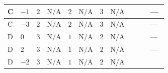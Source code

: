 \documentclass[8pt]{article}
\begin{document}
\begin{landscape}
\begin{longtable}{@{}llcccccc >{\raggedright\arraybackslash}p{0.21\linewidth} >{\raggedright\arraybackslash}p{0.21\linewidth} >{\raggedright\arraybackslash}p{0.21\linewidth}@{}}
\midrule
C & $-1$ & $2$ & $\text{N/A}$ & $2$ & $\text{N/A}$ & $3$ & $\text{N/A}$ & \scriptsize\adjustbox{max width=\linewidth}{$\begin{gathered} +4 {\lambda_{HS_1}^{(1)}}^2\end{gathered}$} & \scriptsize\adjustbox{max width=\linewidth}{$\begin{gathered} +6 {\lambda_{HS_1}^{(1)}} {\lambda_{S_1}^{(1)}}\end{gathered}$} & --- \\
\midrule
C & $-3$ & $2$ & $\text{N/A}$ & $2$ & $\text{N/A}$ & $3$ & $\text{N/A}$ & \scriptsize\adjustbox{max width=\linewidth}{$\begin{gathered} +4 {\lambda_{HS_1}^{(1)}}^2\end{gathered}$} & \scriptsize\adjustbox{max width=\linewidth}{$\begin{gathered} +6 {\lambda_{HS_1}^{(1)}} {\lambda_{S_1}^{(1)}}\end{gathered}$} & --- \\
\midrule
D & $0$ & $3$ & $\text{N/A}$ & $1$ & $\text{N/A}$ & $2$ & $\text{N/A}$ & \scriptsize\adjustbox{max width=\linewidth}{$\begin{gathered} +4 {\lambda_{HS_1}^{(1)}}^2\end{gathered}$} & \scriptsize\adjustbox{max width=\linewidth}{$\begin{gathered} +8 {\lambda_{HS_1}^{(1)}} {\lambda_{S_1}^{(1)}}\end{gathered}$} & --- \\
\midrule
D & $2$ & $3$ & $\text{N/A}$ & $1$ & $\text{N/A}$ & $2$ & $\text{N/A}$ & \scriptsize\adjustbox{max width=\linewidth}{$\begin{gathered} +4 {\lambda_{HS_1}^{(1)}}^2\end{gathered}$} & \scriptsize\adjustbox{max width=\linewidth}{$\begin{gathered} +8 {\lambda_{HS_1}^{(1)}} {\lambda_{S_1}^{(1)}}\end{gathered}$} & --- \\
\midrule
D & $-2$ & $3$ & $\text{N/A}$ & $1$ & $\text{N/A}$ & $2$ & $\text{N/A}$ & \scriptsize\adjustbox{max width=\linewidth}{$\begin{gathered} +4 {\lambda_{HS_1}^{(1)}}^2\end{gathered}$} & \scriptsize\adjustbox{max width=\linewidth}{$\begin{gathered} +8 {\lambda_{HS_1}^{(1)}} {\lambda_{S_1}^{(1)}}\end{gathered}$} & \scriptsize\adjustbox{max width=\linewidth}{$\begin{gathered} +4 {\lambda_{X_{16}}} \left({\lambda_{X_{7}}^{(1)}}\right)^{*}\end{gathered}$} \\

\end{longtable}
\end{landscape}
\end{document}
